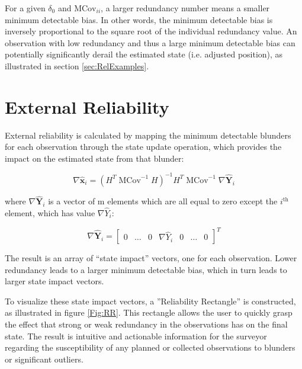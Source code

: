 For a given $\delta_0$ and $\text{MCov}_{ii}$, a larger redundancy number means a smaller minimum detectable bias. In other words, the minimum detectable bias is inversely proportional to the square root of the individual redundancy value. An observation with low redundancy and thus a large minimum detectable bias can potentially significantly derail the estimated state (i.e. adjusted position), as illustrated in section \ref{sec:RelExamples}.

\section{External Reliability} \label{sec:ExtRel}

External reliability is calculated by mapping the minimum detectable blunders for each observation through the state update operation, which provides the impact on the estimated state from that blunder:

\begin{equation}\label{eq:MapMinDetBlunderToState}
\nabla \hat{\textbf{x}}_i = \left( H^T \; \text{MCov}^{-1} \; H \right)^{-1} H^T \; \text{MCov}^{-1} \; \nabla \hat{\textbf{Y}}_i
\end{equation}

where $\nabla \hat{\textbf{Y}}_i$ is a vector of m elements which are all equal to zero except the $i^{\text{th}}$ element, which has value $\nabla \hat{Y}_i$:

\begin{equation}\label{eq:eq:MapMinDetBlunderToState3}
\nabla \hat{\textbf{Y}}_i = \begin{bmatrix}
0 & \ldots & 0 & \nabla \hat{Y}_i & 0 & \ldots & 0
\end{bmatrix}^T
\end{equation}

The result is an array of ``state impact'' vectors, one for each observation. Lower redundancy leads to a larger minimum detectable bias, which in turn leads to larger state impact vectors. 

To visualize these state impact vectors, a ''Reliability Rectangle'' is constructed, as illustrated in figure \ref{Fig:RR}. This rectangle allows the user to quickly grasp the effect that strong or weak redundancy in the observations has on the final state. The result is intuitive and actionable information for the surveyor regarding the susceptibility of any planned or collected observations to blunders or significant outliers.

